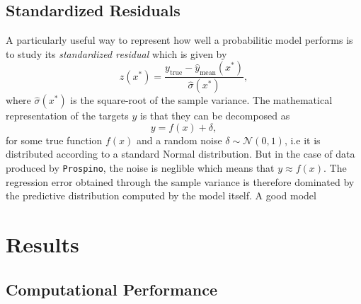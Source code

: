 \subsection{Standardized Residuals}
A particularly useful way to represent how well a probabilitic model performs is to study its \textit{standardized residual} which is given by
\begin{equation}
    z(x^*) = \frac{y_\text{true} - \hat{y}_\text{mean}(x^*)}{\hat{\sigma}(x^*)},
\end{equation}
where $\hat{\sigma}(x^*)$ is the square-root of the sample variance. The mathematical representation of the targets $y$ is that they can be decomposed as
\begin{equation}
    y = f(x) + \delta,
\end{equation}
for some true function $f(x)$ and a random noise $\delta \sim \mathcal{N}(0, 1)$, i.e it is distributed according to a standard Normal distribution. But in the case of data produced by \texttt{Prospino}, the noise is neglible which means that $y \approx f(x)$. The regression error obtained through the sample variance is therefore dominated by the predictive distribution computed by the model itself. A good model 



\section{Results}\label{sec:results}
\subsection{Computational Performance}

